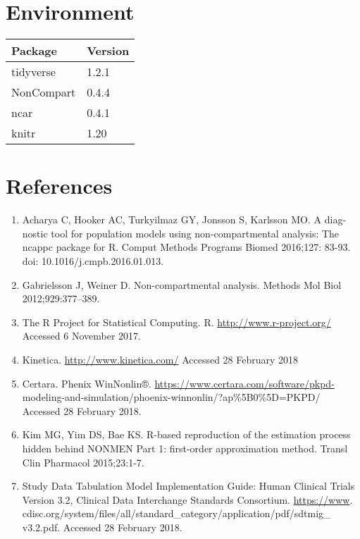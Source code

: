 \documentclass[12pt,]{krantz}
\providecommand{\tightlist}{%
  \setlength{\itemsep}{0pt}\setlength{\parskip}{0pt}}
\theoremstyle{definition}
\theoremstyle{definition}
\theoremstyle{definition}
\theoremstyle{remark}
\begin{document}
\hypertarget{appendix-appendix}{%
\appendix {}}


\hypertarget{environment}{%
\chapter{Environment}\label{environment}}

\begin{tabular}{ll}
\toprule
Package & Version\\
\midrule
tidyverse & 1.2.1\\
NonCompart & 0.4.4\\
ncar & 0.4.1\\
knitr & 1.20\\
\bottomrule
\end{tabular}

\hypertarget{references}{%
\chapter{References}\label{references}}

\begin{enumerate}
\def\labelenumi{\arabic{enumi}.}
\tightlist
\item
  Acharya C, Hooker AC, Turkyilmaz GY, Jonsson S, Karlsson MO. A diag-
  nostic tool for population models using non-compartmental analysis:
  The ncappc package for R. Comput Methods Programs Biomed 2016;127:
  83-93. doi: 10.1016/j.cmpb.2016.01.013.
\item
  Gabrielsson J, Weiner D. Non-compartmental analysis. Methods Mol Biol
  2012;929:377--389.
\item
  The R Project for Statistical Computing. R.
  \url{http://www.r-project.org/} Accessed 6 November 2017.
\item
  Kinetica. \url{http://www.kinetica.com/} Accessed 28 February 2018
\item
  Certara. Phenix WinNonlin®.
  \url{https://www.certara.com/software/pkpd-}
  modeling-and-simulation/phoenix-winnonlin/?ap\%5B0\%5D=PKPD/ Accessed
  28 February 2018.
\item
  Kim MG, Yim DS, Bae KS. R-based reproduction of the estimation process
  hidden behind NONMEN Part 1: first-order approximation method. Transl
  Clin Pharmacol 2015;23:1-7.
\item
  Study Data Tabulation Model Implementation Guide: Human Clinical
  Trials Version 3.2, Clinical Data Interchange Standards Consortium.
  \url{https://www}.
  cdisc.org/system/files/all/standard\_category/application/pdf/sdtmig\_
  v3.2.pdf. Accessed 28 February 2018.
\end{enumerate}


\end{document}
